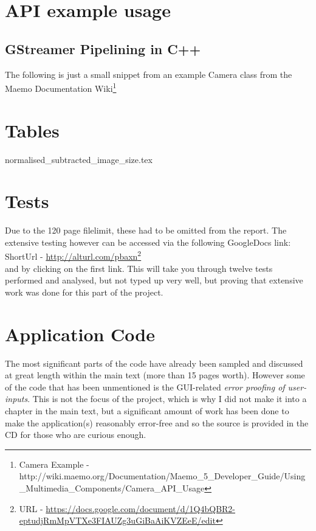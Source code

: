 \section{API example usage}
\subsection{GStreamer Pipelining in C++}
 The following is just a small snippet from an example Camera class from the Maemo Documentation Wiki\footnote{Camera Example - http://wiki.maemo.org/Documentation/Maemo\_5\_Developer\_Guide/Using\_Multimedia\_Components/Camera\_API\_Usage}\label{ref:camex}

\begin{frame}{}
\vspace{-20pt}

\end{frame}

\section{Tables}
{normalised_subtracted_image_size.tex}

\section{Tests}\label{append:tests}
Due to the 120 page filelimit, these had to be omitted from the report. The extensive testing however can be accessed via the following GoogleDocs link:\\\tab ShortUrl - \url{http://alturl.com/pbaxn}\footnote{URL - \url{https://docs.google.com/document/d/1Q4bQBR2-eptudjRmMpVTXe3FIAUZg3uGiBaAiKVZEeE/edit}}\\ and by clicking on the first link. This will take you through twelve tests performed and analysed, but not typed up very well, but proving that extensive work was done for this part of the project.

\section{Application Code}
The most significant parts of the code have already been sampled and discussed at great length within the main text (more than 15 pages worth). However some of the code that has been unmentioned is the GUI-related {\it error proofing of user-inputs}. This is not the focus of the project, which is why I did not make it into a chapter in the main text, but a significant amount of work has been done to make the application(s) reasonably error-free and so the source is provided in the CD for those who are curious enough.

